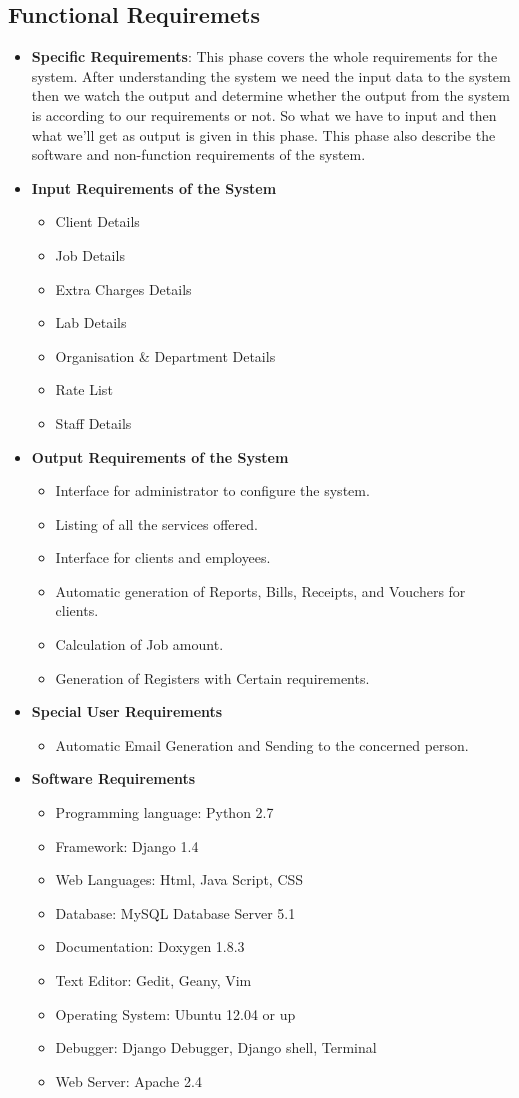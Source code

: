 \subsection{Functional Requiremets}
\begin{itemize}
\item {\bf Specific Requirements}: This phase covers the whole requirements 
for the system. After understanding the system we need the input data 
to the system then we watch the output and determine whether the output 
from the system is according to our requirements or not. So what we have 
to input and then what we’ll get as output is given in this phase. This 
phase also describe the software and non-function requirements of the 
system.
\item {\bf Input Requirements of the System}
\begin{itemize} 
\item Client Details
\item Job Details
\item Extra Charges Details
\item Lab Details
\item Organisation \& Department Details
\item Rate List
\item Staff Details
\end{itemize}
\vskip 0.5cm
\item {\bf Output Requirements of the System}
\begin{itemize} 
\item Interface for administrator to configure the system.
\item Listing of all the services offered.
\item Interface for clients and employees.
\item Automatic generation of Reports, Bills, Receipts, and Vouchers 
for clients.
\item Calculation of Job amount.
\item Generation of Registers with Certain requirements.
\end{itemize}
\vskip 0.5cm
\item {\bf Special User Requirements}
\begin{itemize} 
\item Automatic Email Generation and Sending to the concerned person.
\end{itemize}
\vskip 0.5cm
\item {\bf Software Requirements}
\begin{itemize} 
\item Programming language: Python 2.7
\item Framework: Django 1.4 
\item Web Languages: Html, Java Script, CSS 
\item Database: MySQL Database Server 5.1 
\item Documentation: Doxygen 1.8.3
\item Text Editor: Gedit, Geany, Vim
\item Operating System: Ubuntu 12.04 or up
\item Debugger: Django Debugger, Django shell, Terminal
\item Web Server: Apache 2.4
\end{itemize}
\vskip 0.5cm

\end{itemize}
